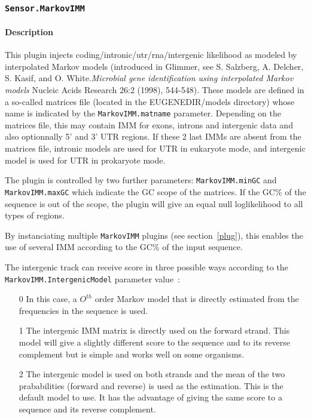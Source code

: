 
\subsubsection{\texttt{Sensor.MarkovIMM}}

\paragraph{Description}

This plugin injects coding/intronic/utr/rna/intergenic likelihood as
modeled by interpolated Markov models (introduced in Glimmer, see S.
Salzberg, A. Delcher, S. Kasif, and O. White.{\em Microbial gene
  identification using interpolated Markov models} Nucleic Acids
Research 26:2 (1998), 544-548). These models are defined in a
so-called matrices file (located in the EUGENEDIR/models directory)
whose name is indicated by the \texttt{MarkovIMM.matname} parameter.
Depending on the matrices file, this may contain IMM for exons,
introns and intergenic data and also optionnally 5' and 3' UTR
regions. If these 2 last IMMs are absent from the matrices file,
intronic models are used for UTR in eukaryote mode, and intergenic
model is used for UTR in prokaryote mode.

The plugin is controlled by two further parameters:
\texttt{MarkovIMM.minGC} and \texttt{MarkovIMM.maxGC} which indicate
the GC scope of the matrices. If the GC\% of the sequence is out of
the scope, the plugin will give an equal null loglikelihood to all types
of regions.

By instanciating multiple \texttt{MarkovIMM} plugins (see
section~\ref{plug}), this enables the use of several IMM according to
the GC\% of the input sequence. 

The intergenic track can receive score in three possible ways
according to the \texttt{MarkovIMM.Interge\-nicModel} parameter value~:
\begin{enumerate}
\item[0] In this case, a $O^{th}$ order Markov model that is directly
  estimated from the frequencies in the sequence is used.
\item[1] The intergenic IMM matrix is directly used on the forward
  strand. This model will give a slightly different score to the
  sequence and to its reverse complement but is simple and works well
  on some organisms.
\item [2] The intergenic model is used on both strands and the mean of
  the two prababilities (forward and reverse) is used as the
  estimation. This is the default model to use. It has the advantage
  of giving the same score to a sequence and its reverse complement.
\end{enumerate}

